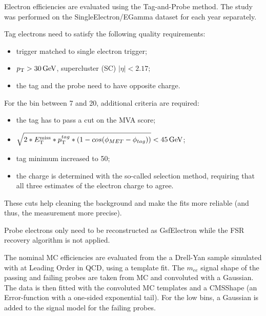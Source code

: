 Electron efficiencies are evaluated using the Tag-and-Probe method.
The study was performed on the SingleElectron/EGamma dataset for each year separately.

Tag electrons need to satisfy the following quality requirements:
\begin{itemize}
\item trigger matched to single electron trigger;
\item $p_{\mathrm{T}} > 30 \,\text{Ge\hspace{-.08em}V}$, supercluster (SC) $|\eta| < 2.17$;%
\item the tag and the probe need to have opposite charge.
\end{itemize}

For the bin between 7 and 20\GeV, additional criteria are required:
\begin{itemize}
\item the tag has to pass a cut on the MVA score;
\item $\sqrt{2*E_{\mathrm{T}}^{\text{miss}}*p_{\mathrm{T}}^{tag}*(1-cos(\phi_{MET}-\phi_{tag}))} < 45 \,\text{Ge\hspace{-.08em}V}$;
\item tag minimum \pt increased to 50\GeV;
\item the charge is determined with the so-called selection method, requiring that all three estimates of the electron charge to agree.
\end{itemize}
These cuts help cleaning the background and make the fits more reliable (and thus, the measurement more precise).

Probe electrons only need to be reconstructed as GsfElectron while the FSR recovery algorithm is not applied.

The nominal MC efficiencies are evaluated from the a Drell-Yan sample simulated with \MADGRAPH at Leading Order in QCD,
using a template fit.
The $m_{ee}$ signal shape of the passing and failing probes are taken from MC and convoluted with a Gaussian.
The data is then fitted with the convoluted MC templates and a CMSShape (an Error-function with a one-sided exponential tail).
For the low \pt bins, a Gaussian is added to the signal model for the failing probes.


